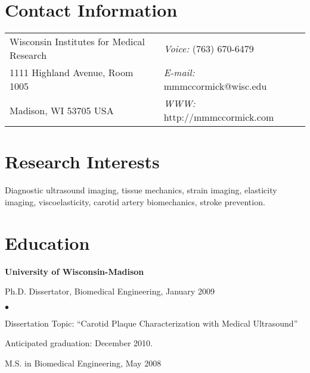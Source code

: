 \documentclass[margin,line]{res}
\newenvironment{list1}{
  \begin{list}{\ding{113}}{%
      \setlength{\itemsep}{0in}
      \setlength{\parsep}{0in} \setlength{\parskip}{0in}
      \setlength{\topsep}{0in} \setlength{\partopsep}{0in} 
      \setlength{\leftmargin}{0.17in}}}{\end{list}}
\newenvironment{list2}{
  \begin{list}{$\bullet$}{%
      \setlength{\itemsep}{0in}
      \setlength{\parsep}{0in} \setlength{\parskip}{0in}
      \setlength{\topsep}{0in} \setlength{\partopsep}{0in} 
      \setlength{\leftmargin}{0.2in}}}{\end{list}}
\begin{document}

\begin{resume}
\section{\sc Contact Information}
\vspace{.05in}
\begin{tabular}{@{}p{3in}p{4in}}
Wisconsin Institutes for Medical Research & {\it Voice:}  (763) 670-6479 \\            
1111 Highland Avenue, Room 1005           & {\it E-mail:}  mmmccormick@wisc.edu \\       
Madison, WI 53705 USA                     & {\it WWW:} http://mmmccormick.com\\     
\end{tabular}


\section{\sc Research Interests}
Diagnostic ultrasound imaging, tissue mechanics, strain imaging, elasticity
imaging, viscoelasticity, carotid artery biomechanics, stroke prevention.

\section{\sc Education}
{\bf University of Wisconsin-Madison} \\
\vspace*{-.1in}
\begin{list1}
\item[] Ph.D. Dissertator, Biomedical Engineering, January 2009
\begin{list2}
\vspace*{.05in}
\item Dissertation Topic:  ``Carotid Plaque Characterization with Medical
Ultrasound''
\item Anticipated graduation: December 2010.
\end{list2}
\vspace*{.05in}
\item[] M.S. in Biomedical Engineering, May 2008
\end{list1}


\end{resume}
\end{document}
